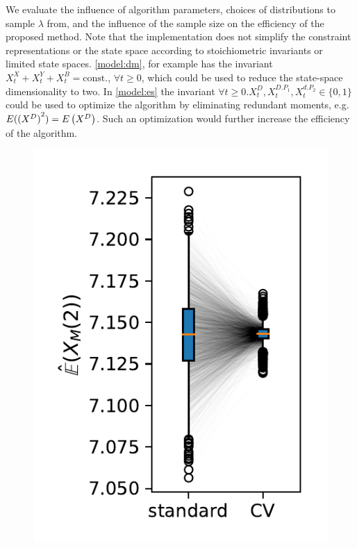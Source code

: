 We evaluate the influence of algorithm parameters, choices of distributions
to sample $\lambda$ from, and the influence of the sample size on the efficiency of
the proposed method.
Note that the implementation does not simplify the constraint representations
or the state space according to stoichiometric invariants or limited
state spaces.
\autoref{model:dm}, for example has the invariant $X^X_t+X^Y_t+X^B_t=\mathrm{const.}$, $\forall t\geq 0$, which
could be used to reduce the state-space dimensionality to two.
In \autoref{model:es} the invariant $\forall t\geq 0.X^D_t,X^{D.{P_1}}_t,X^{d.{P_2}}_t\in\{0,1\}$ could
be used to optimize the algorithm by eliminating redundant moments, e.g.\ ${E}({(X^D)}^2)={E}\left(X^D\right)$.
Such an optimization would further increase the efficiency of the algorithm.

\begin{figure}[t]
    \centering
    \begin{minipage}{.3\textwidth}
    \centering
    \includegraphics[scale=.6]{gfx/reduction.pdf}
    \end{minipage}
    \hspace{1em}

\end{figure}
